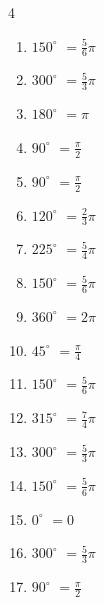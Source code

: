 \begin{multicols}{4}
\begin{enumerate}
  \item $\displaystyle 150^{\circ}$
        $\displaystyle =\frac{5}{6}\pi$

  \item $\displaystyle 300^{\circ}$
        $\displaystyle =\frac{5}{3}\pi$

  \item $\displaystyle 180^{\circ}$
        $\displaystyle =\pi$

  \item $\displaystyle 90^{\circ}$
        $\displaystyle =\frac{\pi}{2}$

  \item $\displaystyle 90^{\circ}$
        $\displaystyle =\frac{\pi}{2}$

  \item $\displaystyle 120^{\circ}$
        $\displaystyle =\frac{2}{3}\pi$

  \item $\displaystyle 225^{\circ}$
        $\displaystyle =\frac{5}{4}\pi$

  \item $\displaystyle 150^{\circ}$
        $\displaystyle =\frac{5}{6}\pi$

  \item $\displaystyle 360^{\circ}$
        $\displaystyle =2\pi$

  \item $\displaystyle 45^{\circ}$
        $\displaystyle =\frac{\pi}{4}$

  \item $\displaystyle 150^{\circ}$
        $\displaystyle =\frac{5}{6}\pi$

  \item $\displaystyle 315^{\circ}$
        $\displaystyle =\frac{7}{4}\pi$

  \item $\displaystyle 300^{\circ}$
        $\displaystyle =\frac{5}{3}\pi$

  \item $\displaystyle 150^{\circ}$
        $\displaystyle =\frac{5}{6}\pi$

  \item $\displaystyle 0^{\circ}$
        $\displaystyle =0$

  \item $\displaystyle 300^{\circ}$
        $\displaystyle =\frac{5}{3}\pi$

  \item $\displaystyle 90^{\circ}$
        $\displaystyle =\frac{\pi}{2}$


\end{enumerate}
\end{multicols}

